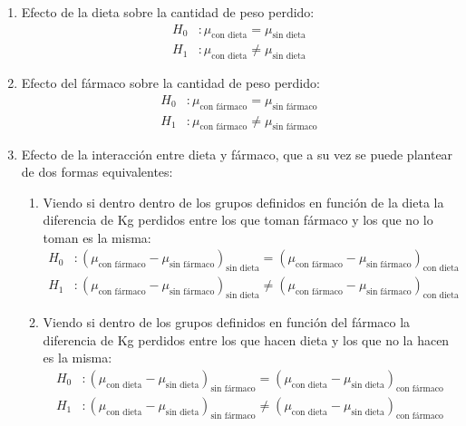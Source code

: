 \begin{enumerate}

\item Efecto de la dieta sobre la cantidad de peso perdido:
\begin{align*}
H_0&: \mu_{\text{con dieta}}=\mu_{\text{sin dieta}}\\
H_1&: \mu_{\text{con dieta}}\neq\mu_{\text{sin dieta}}
\end{align*}
\item Efecto del fármaco sobre la cantidad de peso perdido:
\begin{align*}
H_0&: \mu_{\text{con fármaco}}=\mu_{\text{sin fármaco}}\\
H_1&: \mu_{\text{con fármaco}}\neq\mu_{\text{sin fármaco}}
\end{align*}
\item Efecto de la interacción entre dieta y fármaco, que a su vez se puede plantear de dos formas equivalentes:

\begin{enumerate}
\item Viendo si dentro dentro de los grupos definidos en función de la dieta la diferencia de Kg perdidos entre los que
toman fármaco y los que no lo toman es la misma:
\begin{align*}
H_0&: (\mu_{\text{con fármaco}}-\mu_{\text{sin fármaco}})_{\text{sin dieta}}=(\mu_{\text{con fármaco}}-\mu_{\text{sin fármaco}})_{\text{con
dieta}}\\
H_1&: (\mu_{\text{con fármaco}}-\mu_{\text{sin fármaco}})_{\text{sin dieta}}\neq(\mu_{\text{con fármaco}}-\mu_{\text{sin
fármaco}})_{\text{con dieta}}
\end{align*}
\item Viendo si dentro de los grupos definidos en función del fármaco la diferencia de Kg perdidos entre los que hacen
dieta y los que no la hacen es la misma:
\begin{align*}
H_0&: (\mu_{\text{con dieta}}-\mu_{\text{sin dieta}})_{\text{sin fármaco}}=(\mu_{\text{con dieta}}-\mu_{\text{sin dieta}})_{\text{con
fármaco}}\\ 
H_1&: (\mu_{\text{con dieta}}-\mu_{\text{sin dieta}})_{\text{sin fármaco}}\neq(\mu_{\text{con dieta}}-\mu_{\text{sin
dieta}})_{\text{con fármaco}}
\end{align*}
\end{enumerate}
\end{enumerate}

